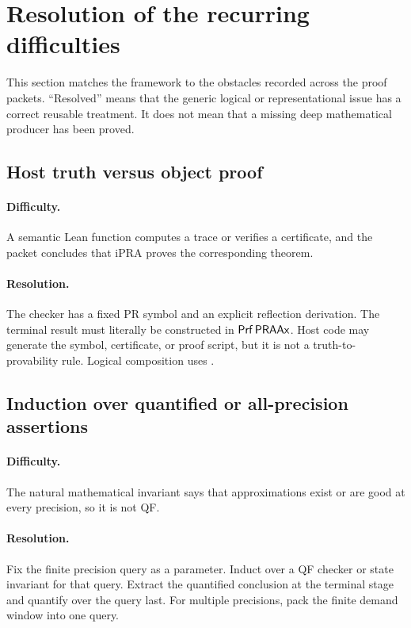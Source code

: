 \section{Resolution of the recurring difficulties}

This section matches the framework to the obstacles recorded across the proof
packets.  ``Resolved'' means that the generic logical or representational issue
has a correct reusable treatment.  It does not mean that a missing deep
mathematical producer has been proved.

\subsection{Host truth versus object proof}

\paragraph{Difficulty.}
A semantic Lean function computes a trace or verifies a certificate, and the
packet concludes that iPRA proves the corresponding theorem.

\paragraph{Resolution.}
The checker has a fixed PR symbol and an explicit reflection derivation.  The
terminal result must literally be constructed in \(\mathsf{Prf}\,\mathsf{PRAAx}\).  Host code
may generate the symbol, certificate, or proof script, but it is not a
truth-to-provability rule.  Logical composition uses .

\subsection{Induction over quantified or all-precision assertions}

\paragraph{Difficulty.}
The natural mathematical invariant says that approximations exist or are good
at every precision, so it is not QF.

\paragraph{Resolution.}
Fix the finite precision query as a parameter.  Induct over a QF checker or
state invariant for that query.  Extract the quantified conclusion at the
terminal stage and quantify over the query last.  For multiple precisions, pack
the finite demand window into one query.

